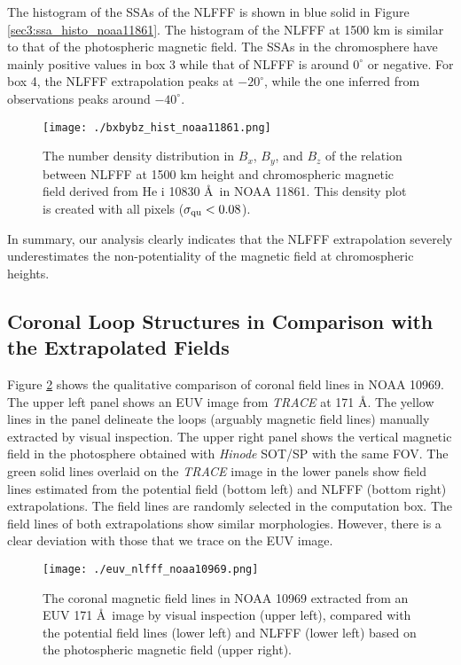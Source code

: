 \documentclass[manuscript]{aastex61}
\begin{document}
The histogram of the SSAs of the NLFFF is shown in blue solid in Figure 
\ref{sec3:ssa_histo_noaa11861}. The histogram of the NLFFF at 1500 km
is similar to that of the photospheric magnetic field. The
SSAs in the chromosphere have mainly positive values in box 3 while that of NLFFF is
around $0^\circ$ or negative. For box 4, the NLFFF extrapolation 
peaks at $-20^\circ$, while the one inferred from observations peaks around $-40^\circ$.
\begin{figure}
\texttt{[image: ./bxbybz\_hist\_noaa11861.png]}
\caption{The number density distribution in $B_x$, $B_y$, and $B_z$ of the relation between NLFFF at 1500 km height and chromospheric magnetic field derived from He {\sc i} 10830 \AA \ in NOAA 11861.  This density plot is created with  all pixels ($\sigma_{\rm qu}<0.08$).}
\label{sec3:bxbybz_hist_noaa11861}
\end{figure}

In summary, our analysis clearly indicates that the NLFFF extrapolation severely
underestimates the non-potentiality of the magnetic field at chromospheric heights.

\subsection{Coronal Loop Structures in Comparison with the Extrapolated Fields
\label{subsec:euv_nlfff}}
Figure \ref{sec3:euv_nlfff_noaa10969} shows the qualitative comparison of
coronal field lines in NOAA 10969. The upper left panel shows  an EUV image from {\it TRACE} at 171 \AA. 
The yellow lines in the panel delineate the loops (arguably magnetic field lines) manually extracted by visual inspection. 
The upper right panel shows the vertical magnetic field in the photosphere obtained
with {\it Hinode} SOT/SP with the same FOV. The green solid lines overlaid on
the {\it TRACE} image in the lower panels show field lines estimated from
the potential field (bottom left) and NLFFF (bottom right) extrapolations. The field lines are
randomly selected in the computation box. The field lines of both extrapolations
show similar morphologies. However, there is a clear deviation with those that
we trace on the EUV image. 
\begin{figure}
\texttt{[image: ./euv\_nlfff\_noaa10969.png]}
\caption{The coronal magnetic field lines in NOAA 10969 extracted from an EUV 171 \AA \ image by visual inspection (upper left),  compared with the potential field lines (lower left) and NLFFF (lower left) based on the photospheric magnetic field (upper right). }
\label{sec3:euv_nlfff_noaa10969}
\end{figure}
\end{document}
